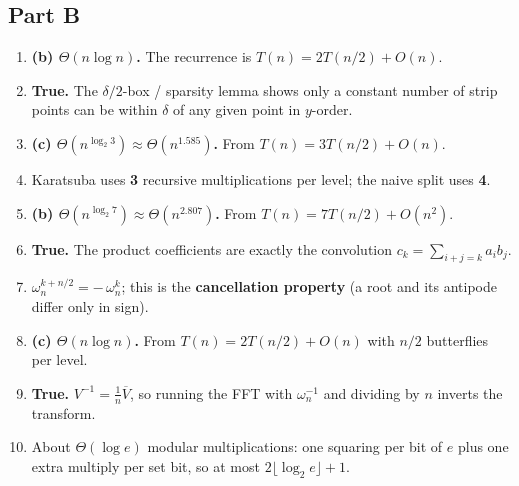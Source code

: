 \documentclass[11pt]{article}
\begin{document}
\subsection*{Part B}

\begin{enumerate}[label=\textbf{B\arabic*.}, leftmargin=2.2em]

\item \textbf{(b) $\Theta(n \log n)$.} The recurrence is $T(n) = 2T(n/2) + O(n)$.

\item \textbf{True.} The $\delta/2$-box / sparsity lemma shows only a constant number of
strip points can be within $\delta$ of any given point in $y$-order.

\item \textbf{(c) $\Theta(n^{\log_2 3}) \approx \Theta(n^{1.585})$.} From $T(n) = 3T(n/2) +
O(n)$.

\item Karatsuba uses \textbf{3} recursive multiplications per level; the naive split uses
\textbf{4}.

\item \textbf{(b) $\Theta(n^{\log_2 7}) \approx \Theta(n^{2.807})$.} From $T(n) = 7T(n/2) +
O(n^2)$.

\item \textbf{True.} The product coefficients are exactly the convolution $c_k = \sum_{i+j=k}
a_i b_j$.

\item $\omega_n^{k+n/2} = -\,\omega_n^k$; this is the \textbf{cancellation property} (a root
and its antipode differ only in sign).

\item \textbf{(c) $\Theta(n \log n)$.} From $T(n) = 2T(n/2) + O(n)$ with $n/2$ butterflies per
level.

\item \textbf{True.} $V^{-1} = \frac1n \overline V$, so running the FFT with $\omega_n^{-1}$
and dividing by $n$ inverts the transform.

\item About $\Theta(\log e)$ modular multiplications: one squaring per bit of $e$ plus one
extra multiply per set bit, so at most $2\lfloor\log_2 e\rfloor + 1$.

\end{enumerate}
\end{document}
